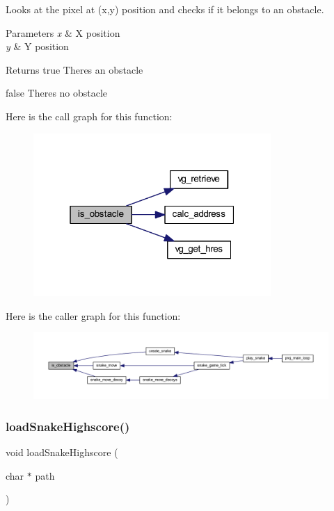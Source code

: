 Looks at the pixel at (x,y) position and checks if it belongs to an obstacle. 


\begin{DoxyParams}{Parameters}
{\em x} & X position \\
\hline
{\em y} & Y position \\
\hline
\end{DoxyParams}
\begin{DoxyReturn}{Returns}
true There\textquotesingle{}s an obstacle 

false There\textquotesingle{}s no obstacle 
\end{DoxyReturn}
Here is the call graph for this function\+:\nopagebreak
\begin{figure}[H]
\begin{center}
\leavevmode
\includegraphics[width=256pt]{group__snake_ga0ee9a6018bc0d0ac0ddbe22eec1e5452_cgraph}
\end{center}
\end{figure}
Here is the caller graph for this function\+:\nopagebreak
\begin{figure}[H]
\begin{center}
\leavevmode
\includegraphics[width=350pt]{group__snake_ga0ee9a6018bc0d0ac0ddbe22eec1e5452_icgraph}
\end{center}
\end{figure}
\mbox{\label{group__snake_gab02c25b496104c83c594be691eb32683}} 
\subsubsection{\texorpdfstring{load\+Snake\+Highscore()}{loadSnakeHighscore()}}
{\footnotesize\ttfamily void load\+Snake\+Highscore (\begin{DoxyParamCaption}\item[{char $\ast$}]{path }\end{DoxyParamCaption})}



